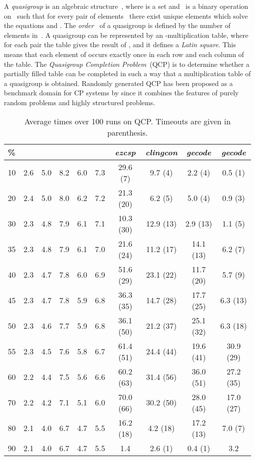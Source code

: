 \documentclass{tlp}
\newcommand{\systemname}[1]{\emph{#1}}
\newcommand{\encsup}{}
\newcommand{\encbou}{}
\newcommand{\encran}{}
\newcommand{\encbouh}[1]{\encbou}
\newcommand{\encranh}[1]{\encran}
\begin{document}
A \emph{quasigroup} is an algebraic structure~, where  is a set and~ is a binary operation on~ such that for every pair of elements~ there exist unique elements  which solve the equations  and . The \emph{order}~ of a quasigroup is defined by the number of elements in~. A quasigroup can be represented by an -multiplication table, where for each pair  the table gives the result of , and it defines a \emph{Latin square}. This means that each element of  occurs exactly once in each row and each column of the table. 
The \emph{Quasigroup Completion Problem}~(QCP) is to determine whether a partially filled table can be completed in such a way that a multiplication table of a quasigroup is obtained.
Randomly generated QCP has been proposed as a benchmark domain for CP systems by  since it combines the features of purely random problems and highly structured problems.
\begin{table}
\caption{Average times over 100 runs on QCP. Timeouts are given in parenthesis.}
\label{tab:qcp}
\begin{minipage}{\textwidth}
\begin{tabular}{cccccccccc} \hline\hline
\% & \encsup & \encbouh{3} & \encbou & \encranh{3} & \encran & \systemname{ezcsp} & \systemname{clingcon} & \systemname{gecode} & \systemname{gecode} \\ \hline
10 & 2.6 & 5.0 & 8.2 & 6.0 & 7.3 &29.6 (7) & 9.7 (4) & 2.2 (4) & 0.5 (1) \\
20 & 2.4 & 5.0 & 8.0 & 6.2 & 7.2 &21.3 (20) & 6.2 (5) & 5.0 (4) & 0.9 (3) \\
30 & 2.3 & 4.8 & 7.9 & 6.1 & 7.1 &10.3 (30) & 12.9 (13) & 2.9 (13) & 1.1 (5) \\
35 & 2.3 & 4.8 & 7.9 & 6.1 & 7.0 &21.6 (24) & 11.2 (17) &14.1 (13) & 6.2 (7) \\
40 & 2.3 & 4.7 & 7.8 & 6.0 & 6.9 &51.6 (29) & 23.1 (22) &11.7 (20) & 5.7 (9) \\
45 & 2.3 & 4.7 & 7.8 & 5.9 & 6.8 &36.3 (35) & 14.7 (28) &17.7 (25) & 6.3 (13) \\
50 & 2.3 & 4.6 & 7.7 & 5.9 & 6.8 &36.1 (50) & 21.2 (37) &25.1 (32) & 6.3 (18) \\
55 & 2.3 & 4.5 & 7.6 & 5.8 & 6.7 &61.4 (51) & 24.4 (44) &19.6 (41) &30.9 (29) \\
60 & 2.2 & 4.4 & 7.5 & 5.6 & 6.6 &60.2 (63) & 31.4 (56) &36.0 (51) &27.2 (35) \\
70 & 2.2 & 4.2 & 7.1 & 5.1 & 6.0 &70.0 (66) & 30.2 (50) &28.0 (45) &17.0 (27) \\
80 & 2.1 & 4.0 & 6.7 & 4.7 & 5.5 &16.2 (18) & 4.2 (18) &17.2 (13) & 7.0 (7) \\
90 & 2.1 & 4.0 & 6.7 & 4.7 & 5.5 & 1.4 & 2.6 (1) & 0.4 (1) & 3.2 \\ \hline\hline
\end{tabular}
\vspace{-2\baselineskip}
\end{minipage}
\end{table}
\end{document}
